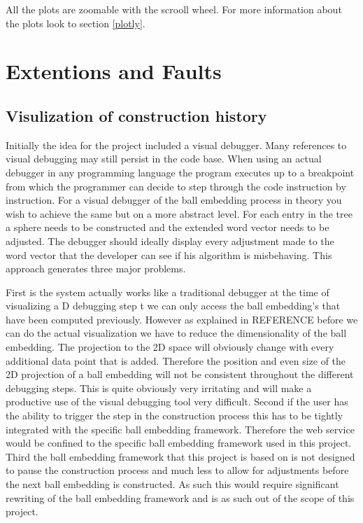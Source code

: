 \documentclass[]{article}
\begin{document}
All the plots are zoomable with the scrooll wheel. 
For more information about the plots look to section \ref{plotly}.

\section{Extentions and Faults}
\subsection{Visulization of construction history}
Initially the idea for the project included a visual debugger. Many references to visual debugging may still persist in the code base. When using an actual debugger in any programming language the program executes up to a breakpoint from which the programmer can decide to step through the code instruction by instruction. For a visual debugger of the ball embedding process in theory you wish to achieve the same but on a more abstract level. For each entry in the tree a sphere needs to be constructed and the extended word vector needs to be adjusted. The debugger should ideally display every adjustment made to the word vector that the developer can see if his algorithm is misbehaving. This approach generates three major problems. 

First is the system actually works like a traditional debugger at the time of visualizing a D debugging step t we can only access the ball embedding's that have been computed previously. However as explained in REFERENCE before we can do the actual visualization we have to reduce the dimensionality of the ball embedding. The projection to the 2D space will obviously change with every additional data point that is added. Therefore the position and even size of the 2D projection of a ball embedding will not be consistent throughout the different debugging steps. This is quite obviously very irritating and will make a productive use of the visual debugging tool very difficult.
Second if the user has the ability to trigger the step in the construction process this has to be tightly integrated with the specific ball embedding framework. Therefore the web service would be confined to the specific ball embedding framework used in this project. 
Third the ball embedding framework that this project is based on is not designed to pause the construction process and much less to allow for adjustments before the next ball embedding is constructed. As such this would require significant rewriting of the ball embedding framework and is as such out of the scope of this project.
\end{document}
